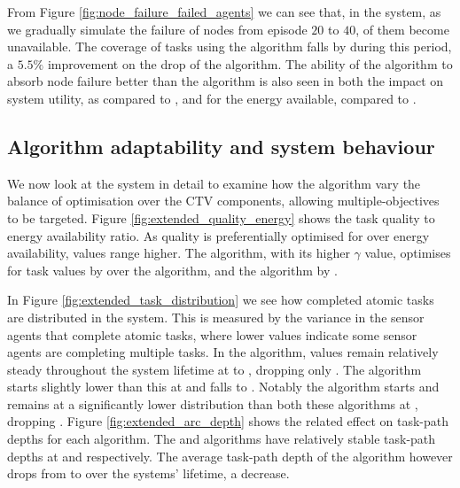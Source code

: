 From Figure \ref{fig:node_failure_failed_agents} we can see that, in the \simulationNodeFailure{}{} system, as we gradually simulate the failure of nodes from episode $20$ to $40$,  \resultsNodeFailureFailedAgentsBalancedDiff{}{} of them become unavailable. The coverage  of tasks using the \algorithmBalanced{}{} algorithm falls by \resultsNodeFailureCoverageBalancedDiff{}{} during this period, a $5.5\%$ improvement on  the \resultsNodeFailureCoverageQRoutingDiff{}{} drop of the \algorithmQRouting{}{} algorithm. The ability of the \algorithmBalanced{}{} algorithm to absorb node failure better than the \algorithmQRouting{}{} algorithm is also seen in both the impact on system utility, \resultsNodeFailureCTVBalancedImpactDiff{}{} as compared to \resultsNodeFailureCTVQRoutingImpactDiff{}{}, and for the energy available, \resultsNodeFailureCTVBalancedImpactDiff{}{} compared to \resultsNodeFailureCTVQRoutingImpactDiff{}{}.


\subsection{Algorithm adaptability and system behaviour}

We now look at the \simulationExtended{}{} system in detail to examine how the algorithm vary the balance  of optimisation over the CTV components, allowing multiple-objectives to be targeted. Figure 	\ref{fig:extended_quality_energy} shows the task quality to energy availability ratio. 
As quality is preferentially optimised for over energy availability, values range higher. The \algorithmQuality{}{} algorithm, with its higher $\gamma$ value, optimises for task values by \resultsQEQualityEnd{}{} over the \algorithmEnergy{}{} algorithm, and the \algorithmDistribution{}{} algorithm by \resultsQEDistDiff{}{}. 

In Figure \ref{fig:extended_task_distribution} we see how completed atomic tasks are distributed in the system. This is measured by the variance in the sensor agents that complete atomic tasks, where lower values indicate some sensor agents are completing multiple tasks. In the \algorithmDistribution{}{} algorithm, values remain relatively steady throughout the system lifetime at \resultsTaskDistDistStart{}{} to \resultsTaskDistDistEnd{}{}, dropping only \resultsTaskDistDistPercent{}{}. The \algorithmQuality{}{} algorithm starts slightly lower than this at \resultsTaskDistQualityStart{}{} and falls \resultsTaskDistQualityPercent{}{} to \resultsTaskDistQualityEnd{}{}. Notably the \algorithmEnergy{}{} algorithm starts and remains at a significantly lower distribution than both these algorithms at \resultsTaskDistEnergyEnd{}{}, dropping \resultsTaskDistEnergydPercent{}{}. Figure
\ref{fig:extended_arc_depth} shows the related effect on task-path depths for each algorithm. The \algorithmQuality{}{} and \algorithmDistribution{}{} algorithms have relatively stable task-path depths at \resultsArcDepthQualityEnd{}{} and \resultsArcDepthDistEnd{}{} respectively. The average task-path depth of the \algorithmEnergy{}{} algorithm however drops from \resultsArcDepthEnergyStart{}{} to  \resultsArcDepthEnergyEnd{}{} over the systems' lifetime, a \resultsArcDepthEnergyPercent{}{} decrease.

